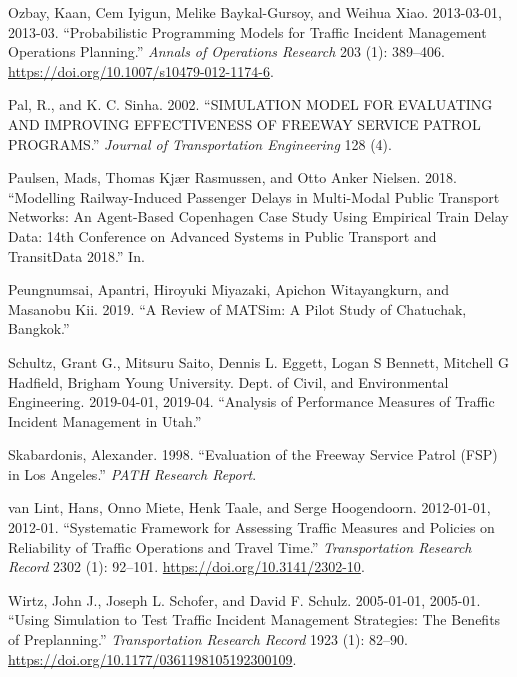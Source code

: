 \documentclass[
  letterpaper,
  DIV=11,
  numbers=noendperiod]{scrreprt}
\newlength{\cslhangindent}
\newlength{\cslentryspacingunit} %
\newenvironment{CSLReferences}[2] %
 {%
  \setlength{\parindent}{0pt}
  \ifodd #1
  \let\oldpar\par
  \def\par{\hangindent=\cslhangindent\oldpar}
  \fi
  \setlength{\parskip}{#2\cslentryspacingunit}
 }%
 {}
\begin{document}
\begin{CSLReferences}{1}{0}
\leavevmode{}%
Ozbay, Kaan, Cem Iyigun, Melike Baykal-Gursoy, and Weihua Xiao.
2013-03-01, 2013-03. {``Probabilistic Programming Models for Traffic
Incident Management Operations Planning.''} \emph{Annals of Operations
Research} 203 (1): 389--406.
\url{https://doi.org/10.1007/s10479-012-1174-6}.

\leavevmode{}%
Pal, R., and K. C. Sinha. 2002. {``{SIMULATION MODEL FOR EVALUATING AND
IMPROVING EFFECTIVENESS OF FREEWAY SERVICE PATROL PROGRAMS}.''}
\emph{Journal of Transportation Engineering} 128 (4).

\leavevmode{}%
Paulsen, Mads, Thomas Kjær Rasmussen, and Otto Anker Nielsen. 2018.
{``Modelling Railway-Induced Passenger Delays in Multi-Modal Public
Transport Networks: {An} Agent-Based Copenhagen Case Study Using
Empirical Train Delay Data: 14th Conference on Advanced Systems in
Public Transport and {TransitData} 2018.''} In.

\leavevmode{}%
Peungnumsai, Apantri, Hiroyuki Miyazaki, Apichon Witayangkurn, and
Masanobu Kii. 2019. {``A Review of {MATSim}: {A} Pilot Study of
Chatuchak, Bangkok.''}

\leavevmode{}%
Schultz, Grant G., Mitsuru Saito, Dennis L. Eggett, Logan S Bennett,
Mitchell G Hadfield, Brigham Young University. Dept. of Civil, and
Environmental Engineering. 2019-04-01, 2019-04. {``Analysis of
Performance Measures of Traffic Incident Management in Utah.''}

\leavevmode{}%
Skabardonis, Alexander. 1998. {``Evaluation of the Freeway Service
Patrol ({FSP}) in Los Angeles.''} \emph{PATH Research Report}.

\leavevmode{}%
van Lint, Hans, Onno Miete, Henk Taale, and Serge Hoogendoorn.
2012-01-01, 2012-01. {``Systematic Framework for Assessing Traffic
Measures and Policies on Reliability of Traffic Operations and Travel
Time.''} \emph{Transportation Research Record} 2302 (1): 92--101.
\url{https://doi.org/10.3141/2302-10}.

\leavevmode{}%
Wirtz, John J., Joseph L. Schofer, and David F. Schulz. 2005-01-01,
2005-01. {``Using Simulation to Test Traffic Incident Management
Strategies: {The} Benefits of Preplanning.''} \emph{Transportation
Research Record} 1923 (1): 82--90.
\url{https://doi.org/10.1177/0361198105192300109}.

\end{CSLReferences}
\end{document}

